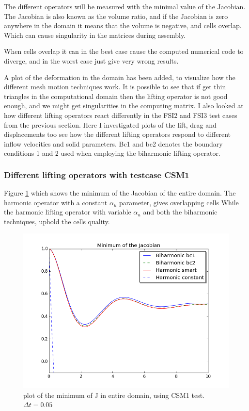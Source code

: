 The different operators will be measured with the minimal value of the Jacobian. The Jacobian is also known as the volume ratio, and if the Jacobian is zero anywhere in the domain it means that the volume is negative, and cells overlap. Which can cause singularity in the matrices during assembly. 

When cells overlap it can in the best case cause the computed numerical code to diverge, and in the worst case just give very wrong results. \newline

A plot of the deformation in the domain has been added, to visualize how the different mesh motion techniques work. It is possible to see that if get thin triangles in the computational domain then the lifting operator is not good enough, and we might get singularities in the computing matrix.
I also looked at how different lifting operators react differently in the FSI2 and FSI3 test cases from the previous section. Here I investigated plots of the lift, drag and displacements too see how the different lifting operators respond to different inflow velocities and solid parameters. Bc1 and bc2 denotes the boundary conditions 1 and 2 used when employing the biharmonic lifting operator.


\subsubsection*{Different lifting operators with testcase CSM1}
Figure \ref{fig:fluid_structure} which shows the minimum of the Jacobian of the entire domain. The harmonic operator with a constant $\alpha_u$ parameter, gives overlapping cells
While the harmonic lifting operator with variable $\alpha_u$ and both the biharmonic techniques, uphold the cells quality.

\begin{figure}[H]
  \label{fig:fluid_structure}
  \includegraphics[scale=0.60, trim={0mm 0mm 0mm 0mm},clip]{./Mesh_motion_results/CSM1.png}
   \caption{plot of the minimum of J in entire domain, using CSM1 test. $\Delta t = 0.05$}
\end{figure}

